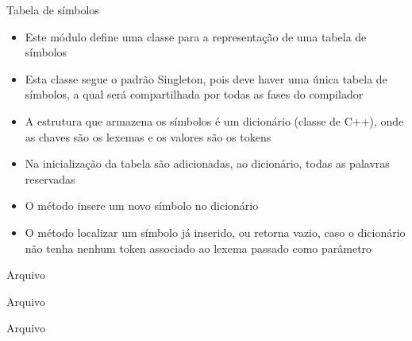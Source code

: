 \begin{frame}[fragile]{Tabela de símbolos}

    \begin{itemize}
        \item Este módulo define uma classe para a representação de uma tabela de símbolos

        \item Esta classe segue o padrão Singleton, pois deve haver uma única tabela de símbolos, a qual será compartilhada por todas as fases do compilador

        \item A estrutura que armazena os símbolos é um dicionário (classe  de C++), onde as chaves são os lexemas e os valores são os tokens

        \item Na inicialização da tabela são adicionadas, ao dicionário, todas as palavras reservadas

        \item O método  insere um novo símbolo no dicionário

        \item O método  localizar um símbolo já inserido, ou retorna vazio, caso o dicionário não tenha nenhum token associado ao lexema
            passado como parâmetro
    \end{itemize}

\end{frame}

\begin{frame}[fragile]{Arquivo }
\end{frame}

\begin{frame}[fragile]{Arquivo }
\end{frame}

\begin{frame}[fragile]{Arquivo }
\end{frame}

